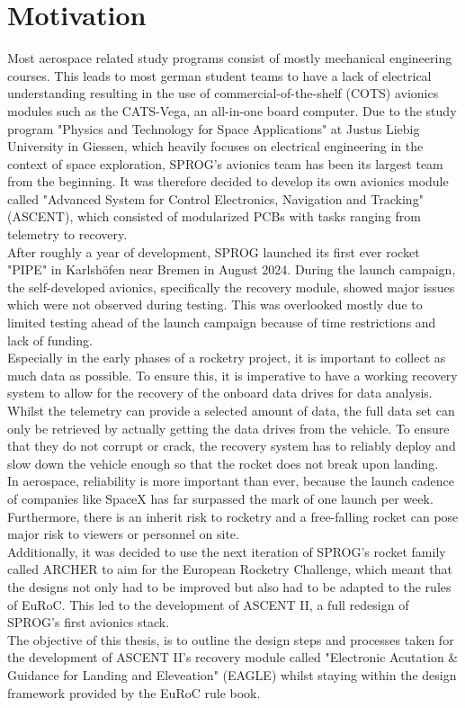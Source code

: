 \documentclass[fontsize=11pt,%
twoside,%
BCOR          = 8mm, %
DIV           = 11,  %
titlepage     = off,%
index=totoc,%
xcolor        = pdftex,%
dvipsnames,%
bibliography  = totoc,%
bibliography = numbered, %
listof        = notnumbered]{scrreprt}
\begin{document}
\section{Motivation}
Most aerospace related study programs consist of mostly mechanical engineering courses. This leads to most german student teams to have a lack of electrical understanding resulting in the use of commercial-of-the-shelf (COTS) avionics modules such as the CATS-Vega, an all-in-one board computer. Due to the study program "Physics and Technology for Space Applications" at Justus Liebig University in Giessen, which heavily focuses on electrical engineering in the context of space exploration, SPROG's avionics team has been its largest team from the beginning. It was therefore decided to develop its own avionics module called "Advanced System for Control Electronics, Navigation and Tracking" (ASCENT), which consisted of modularized PCBs with tasks ranging from telemetry to recovery.\\
After roughly a year of development, SPROG launched its first ever rocket "PIPE" in Karlshöfen near Bremen in August 2024. During the launch campaign, the self-developed avionics, specifically the recovery module, showed major issues which were not observed during testing. This was overlooked mostly due to limited testing ahead of the launch campaign because of time restrictions and lack of funding.\\
Especially in the early phases of a rocketry project, it is important to collect as much data as possible. To ensure this, it is imperative to have a working recovery system to allow for the recovery of the onboard data drives for data analysis. Whilst the telemetry can provide a selected amount of data, the full data set can only be retrieved by actually getting the data drives from the vehicle. To ensure that they do not corrupt or crack, the recovery system has to reliably deploy and slow down the vehicle enough so that the rocket does not break upon landing.\\
In aerospace, reliability is more important than ever, because the launch cadence of companies like SpaceX has far surpassed the mark of one launch per week. Furthermore, there is an inherit risk to rocketry and a free-falling rocket can pose major risk to viewers or personnel on site.\\
Additionally, it was decided to use the next iteration of SPROG's rocket family called ARCHER to aim for the European Rocketry Challenge, which meant that the designs not only had to be improved but also had to be adapted to the rules of EuRoC. This led to the development of ASCENT II, a full redesign of SPROG's first avionics stack.\\
The objective of this thesis, is to outline the design steps and processes taken for the development of ASCENT II's recovery module called "Electronic Acutation \& Guidance for Landing and Eleveation" (EAGLE) whilst staying within the design framework provided by the EuRoC rule book.
\end{document}
